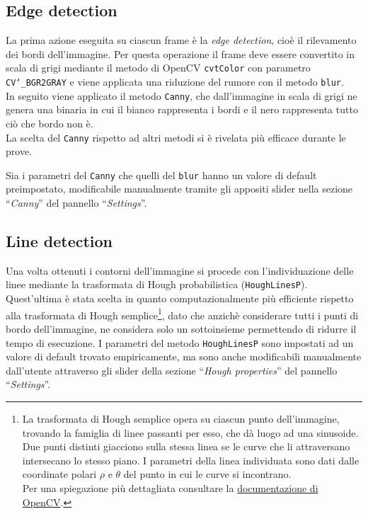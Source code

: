 \documentclass[12pt]{article}
\begin{document}
\subsection{Edge detection}
\hspace{0.2 cm} La prima azione eseguita su ciascun frame è la \textit{edge detection}, cioè il rilevamento dei bordi dell'immagine. Per questa operazione il frame deve essere convertito in scala di grigi mediante il metodo di OpenCV \texttt{cvtColor} con parametro \texttt{CV\char`_BGR2GRAY} e viene applicata una riduzione del rumore con il metodo \texttt{blur}.\\
In seguito viene applicato il metodo \texttt{Canny}, che dall'immagine in scala di grigi ne genera una binaria in cui il bianco rappresenta i bordi e il nero rappresenta tutto ciò che bordo non è.\\
La scelta del \texttt{Canny} rispetto ad altri metodi si è rivelata più efficace durante le prove.

Sia i parametri del \texttt{Canny} che quelli del \texttt{blur} hanno un valore di default preimpostato, modificabile manualmente tramite gli appositi slider nella sezione ``\textit{Canny}'' del pannello ``\textit{Settings}''.

\subsection{Line detection}
\hspace{0.2 cm} Una volta ottenuti i contorni dell'immagine si procede con l'individuazione delle linee mediante la trasformata di Hough probabilistica (\texttt{HoughLinesP}). Quest'ultima è stata scelta in quanto computazionalmente più efficiente rispetto alla trasformata di Hough semplice{\footnote{La trasformata di Hough semplice opera su ciascun punto dell'immagine, trovando la famiglia di linee passanti per esso, che dà luogo ad una sinusoide. Due punti distinti giacciono sulla stessa linea se le curve che li attraversano intersecano lo stesso piano. I parametri della linea individuata sono dati dalle coordinate polari $\rho$ e $\theta$ del punto in cui le curve si incontrano.\\ \hspace{0.2 cm}Per una spiegazione più dettagliata consultare la \href{http://docs.opencv.org/2.4/doc/tutorials/imgproc/imgtrans/hough_lines/hough_lines.html}{documentazione di OpenCV}.}}, dato che anzichè considerare tutti i punti di bordo dell'immagine, ne considera solo un sottoinsieme permettendo di ridurre il tempo di esecuzione.
I parametri del metodo \texttt{HoughLinesP} sono impostati ad un valore di default trovato empiricamente, ma sono anche modificabili manualmente dall'utente attraverso gli slider della sezione ``\textit{Hough properties}'' del pannello ``\textit{Settings}''.
\end{document}
